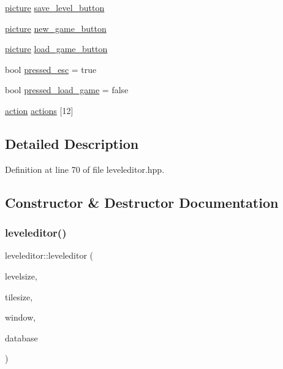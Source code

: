 \begin{DoxyCompactItemize}
\item 
\hyperlink{classpicture}{picture} \hyperlink{classleveleditor_ac05afa3b3ddd67cc6be6df6a43f1526f}{save\+\_\+level\+\_\+button}
\item 
\hyperlink{classpicture}{picture} \hyperlink{classleveleditor_aa227a29f049d0b381c05b0e08ea12775}{new\+\_\+game\+\_\+button}
\item 
\hyperlink{classpicture}{picture} \hyperlink{classleveleditor_adc1e2055b7a34c0719af86f0778b8954}{load\+\_\+game\+\_\+button}
\item 
bool \hyperlink{classleveleditor_a45f7bffb16d54852e0e24902d23f3a91}{pressed\+\_\+esc} = true
\item 
bool \hyperlink{classleveleditor_a31762448e212fa345f3a3b6d5ce81d66}{pressed\+\_\+load\+\_\+game} = false
\item 
\hyperlink{classaction}{action} \hyperlink{classleveleditor_a17bf53d8483496da9967d5344293db54}{actions} \mbox{[}12\mbox{]}
\end{DoxyCompactItemize}


\subsection{Detailed Description}


Definition at line 70 of file leveleditor.\+hpp.



\subsection{Constructor \& Destructor Documentation}
\mbox{\label{classleveleditor_a5dfc809a9bac07ffa88ce921c077f017}} 
\subsubsection{\texorpdfstring{leveleditor()}{leveleditor()}}
{\footnotesize\ttfamily leveleditor\+::leveleditor (\begin{DoxyParamCaption}\item[{sf\+::\+Vector2f}]{levelsize,  }\item[{sf\+::\+Vector2f}]{tilesize,  }\item[{sf\+::\+Render\+Window \&}]{window,  }\item[{\hyperlink{classsql}{sql} \&}]{database }\end{DoxyParamCaption})}



